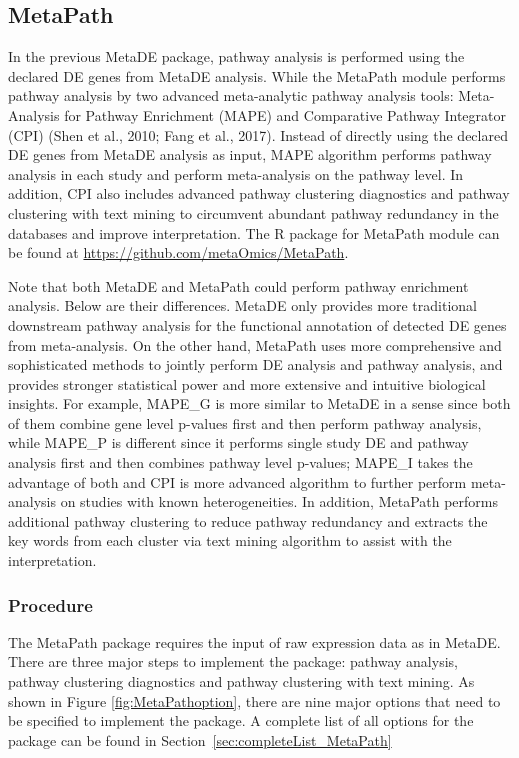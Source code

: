 \subsection{MetaPath}

In the previous MetaDE package,
pathway analysis is performed using the declared DE genes from MetaDE analysis.
While  the MetaPath module  performs pathway analysis by two advanced meta-analytic pathway analysis tools: 
Meta-Analysis for Pathway Enrichment (MAPE) and Comparative Pathway Integrator (CPI) (Shen et al., 2010; Fang et al., 2017). 
Instead of directly using the declared DE genes from MetaDE analysis as input, 
MAPE algorithm performs pathway analysis in each study and perform meta-analysis on the pathway level.
In addition, CPI also includes advanced pathway clustering diagnostics and pathway clustering with text mining to circumvent abundant pathway redundancy in the databases and improve interpretation. 
The R package for MetaPath module can be found at \url{https://github.com/metaOmics/MetaPath}.

Note that both MetaDE and MetaPath could perform pathway enrichment analysis.
Below are their differences.
MetaDE only provides more traditional downstream pathway analysis for the functional annotation of detected DE genes from meta-analysis. On the other hand, MetaPath uses more comprehensive and sophisticated methods to jointly perform DE analysis and pathway analysis, and provides stronger statistical power and more extensive and intuitive biological insights. For example, MAPE\_G is more similar to MetaDE in a sense since both of them combine gene level p-values first and then perform pathway analysis, while MAPE\_P is different since it performs single study DE and pathway analysis first and then combines pathway level p-values; MAPE\_I takes the advantage of both and CPI is more advanced algorithm to further perform meta-analysis on studies with known heterogeneities. In addition, MetaPath performs additional pathway clustering to reduce pathway redundancy and extracts the key words from each cluster via text mining algorithm to assist with the interpretation. 

\subsubsection{Procedure}
The MetaPath package requires the input of raw expression data as in MetaDE. 
There are three major steps to implement the package: pathway analysis, pathway clustering diagnostics and pathway clustering with text mining. 
As shown in Figure \ref{fig:MetaPathoption}, there are nine major options that need to be specified to implement the package.
A complete list of all options for the package can be found in Section~\ref{sec:completeList_MetaPath} 


